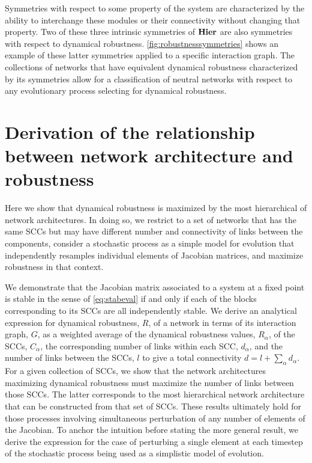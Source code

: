 Symmetries with respect to some property of the system are characterized by the ability to interchange these modules or their connectivity without changing that property. Two of these three intrinsic symmetries of $\mathbf{Hier}$ are also symmetries with respect to dynamical robustness. \ref{fig:robustnesssymmetries} shows an example of these latter symmetries applied to a specific interaction graph. The collections of networks that have equivalent dynamical robustness characterized by its symmetries allow for a classification of neutral networks with respect to any evolutionary process selecting for dynamical robustness.

\section{Derivation of the relationship between network architecture and robustness}
Here we show that dynamical robustness is maximized by the most hierarchical of network architectures. In doing so, we restrict to a set of networks that has the same SCCs but may have different number and connectivity of links between the components, consider a stochastic process as a simple model for evolution that independently resamples individual elements of Jacobian matrices, and maximize robustness in that context.

We demonstrate that the Jacobian matrix associated to a system at a fixed point is stable in the sense of \ref{eq:stabeval} if and only if each of the blocks corresponding to its SCCs are all independently stable. We derive an analytical expression for dynamical robustness, $R$, of a network in terms of its interaction graph, $G$, as a weighted average of the dynamical robustness values, $R_{\alpha}$, of the SCCs, $C_{\alpha}$, the corresponding number of links within each SCC, $d_{\alpha}$, and the number of links between the SCCs, $l$ to give a total connectivity $d = l + \sum_{\alpha} d_{\alpha}$. For a given collection of SCCs, we show that the network architectures maximizing dynamical robustness must maximize the number of links between those SCCs. The latter corresponds to the most hierarchical network architecture that can be constructed from that set of SCCs.
These results ultimately hold for those processes involving simultaneous perturbation of any number of elements of the Jacobian. To anchor the intuition before stating the more general result, we derive the expression for the case of perturbing a single element at each timestep of the stochastic process being used as a simplistic model of evolution.

